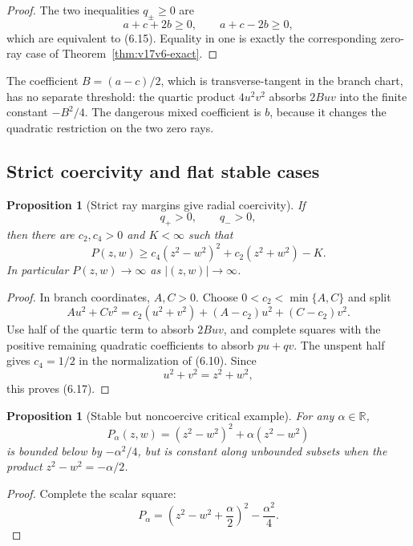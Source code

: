 \documentclass[11pt]{article}
\newtheorem{proposition}[theorem]{Proposition}
\theoremstyle{remark}
\begin{document}
\begin{proof}
The two inequalities \(q_\pm\geq0\) are
\[
 a+c+2b\geq0,\qquad a+c-2b\geq0,
\]
which are equivalent to (6.15).  Equality in one is exactly the
corresponding zero-ray case of Theorem~\ref{thm:v17v6-exact}.
\end{proof}

The coefficient \(B=(a-c)/2\), which is transverse-tangent in the
branch chart, has no separate threshold: the quartic product
\(4u^2v^2\) absorbs \(2Buv\) into the finite constant
\(-B^2/4\).  The dangerous mixed coefficient is \(b\), because it
changes the quadratic restriction on the two zero rays.

\subsection{Strict coercivity and flat stable cases}

\begin{proposition}[Strict ray margins give radial coercivity]
\label{prop:v17v6-coercive}
If
\[
 q_+>0,\qquad q_->0,                                \tag{6.16}
\]
then there are \(c_2,c_4>0\) and \(K<\infty\) such that
\[
 P(z,w)
 \geq
 c_4(z^2-w^2)^2+c_2(z^2+w^2)-K.                   \tag{6.17}
\]
In particular \(P(z,w)\to\infty\) as
\(|(z,w)|\to\infty\).
\end{proposition}

\begin{proof}
In branch coordinates, \(A,C>0\).  Choose
\(0<c_2<\min\{A,C\}\) and split
\[
 A u^2+C v^2
 =
 c_2(u^2+v^2)+(A-c_2)u^2+(C-c_2)v^2.
\]
Use half of the quartic term to absorb \(2Buv\), and complete squares
with the positive remaining quadratic coefficients to absorb
\(pu+qv\).  The unspent half gives \(c_4=1/2\) in the normalization
of (6.10).  Since
\[
 u^2+v^2=z^2+w^2,
\]
this proves (6.17).
\end{proof}

\begin{proposition}[Stable but noncoercive critical example]
\label{prop:v17v6-flat}
For any \(\alpha\in\mathbb R\),
\[
 P_\alpha(z,w)
 =
 (z^2-w^2)^2+\alpha(z^2-w^2)                       \tag{6.18}
\]
is bounded below by \(-\alpha^2/4\), but is constant along
unbounded subsets when the product \(z^2-w^2=-\alpha/2\).
\end{proposition}

\begin{proof}
Complete the scalar square:
\[
 P_\alpha
 =
 \left(z^2-w^2+\frac\alpha2\right)^2
 -\frac{\alpha^2}{4}.                              \tag{6.19}
\]
\end{proof}
\end{document}
